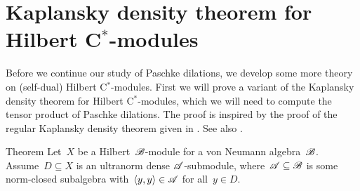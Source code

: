 \documentclass[b]{subfiles}
\begin{document}
\section{Kaplansky density theorem for Hilbert C$^*$-modules}
\begin{parsec}%
\begin{point}%
Before we continue our study of Paschke dilations,
    we develop some more theory on (self-dual) Hilbert C$^*$-modules.
First we will prove a variant of the Kaplansky density
    theorem for Hilbert C$^*$-modules,
    which we will need to compute the tensor product of Paschke dilations.
The proof is inspired by the proof of the regular Kaplansky density theorem
    given in \cite[Thm.~1.2.2]{arveson2012invitation}.
See also .
\end{point}
\begin{point}{Theorem}%
Let~$X$ be a Hilbert~$\mathscr{B}$-module for a von Neumann algebra~$\mathscr{B}$.
Assume~$D \subseteq X$ is an ultranorm dense $\mathscr{A}$-submodule,
    where~$\mathscr{A} \subseteq \mathscr{B}$ is some norm-closed subalgebra
    with~$\langle y,y \rangle \in \mathscr{A}$ for all~$y \in D$.


\end{point}
\end{parsec}
\end{document}
